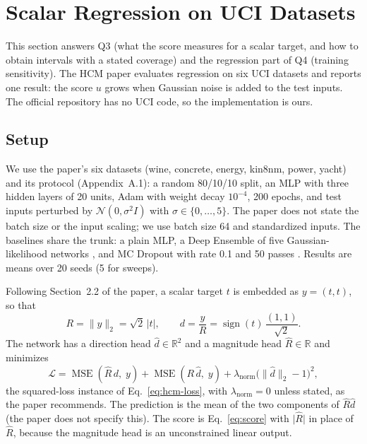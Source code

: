 
\section{Scalar Regression on UCI Datasets}
\label{sec:uci}

This section answers Q3 (what the score measures for a scalar target, and how to obtain
intervals with a stated coverage) and the regression part of Q4 (training sensitivity). The
HCM paper evaluates regression on six UCI datasets \citep{dua2017uci,hernandez2015pbp} and reports one
result: the score $u$ grows when Gaussian noise is added to the test inputs. The official
repository has no UCI code, so the implementation is ours.

\subsection{Setup}
\label{sec:uci-setup}

We use the paper's six datasets (wine, concrete, energy, kin8nm, power, yacht) and its
protocol (Appendix~A.1): a random 80/10/10 split, an MLP with three hidden layers of 20
units, Adam with weight decay $10^{-4}$, 200 epochs, and test inputs perturbed by
$\mathcal{N}(0,\sigma^2 I)$ with $\sigma\in\{0,\dots,5\}$. The paper does not state the
batch size or the input scaling; we use batch size 64 and standardized inputs. The baselines share the trunk: a plain MLP, a Deep Ensemble of five
Gaussian-likelihood networks \citep{lakshminarayanan2017simple}, and MC Dropout with rate
0.1 and 50 passes \citep{gal2016dropout}. Results are means over 20 seeds (5 for sweeps).

Following Section~2.2 of the paper, a scalar target $t$ is embedded as $y=(t,t)$, so that
\begin{equation}
  R=\lVert y\rVert_2=\sqrt{2}\,\lvert t\rvert,\qquad
  d=\frac{y}{R}=\operatorname{sign}(t)\,\frac{(1,1)}{\sqrt{2}} .
  \label{eq:scalar}
\end{equation}
The network has a direction head $\hat d\in\mathbb{R}^2$ and a magnitude head
$\hat R\in\mathbb{R}$ and minimizes
\begin{equation}
  \mathcal{L}=\operatorname{MSE}(\hat R\,d,\;y)+\operatorname{MSE}(R\,\hat d,\;y)
  +\lambda_{\text{norm}}\bigl(\lVert\hat d\rVert_2-1\bigr)^2 ,
  \label{eq:loss}
\end{equation}
the squared-loss instance of Eq.~\eqref{eq:hcm-loss}, with $\lambda_{\text{norm}}=0$ unless
stated, as the paper recommends. The prediction is the mean of the two components of
$\hat R\hat d$ (the paper does not specify this). The score is Eq.~\eqref{eq:score} with
$\lvert\hat R\rvert$ in place of $\hat R$, because the magnitude head is an unconstrained
linear output.

